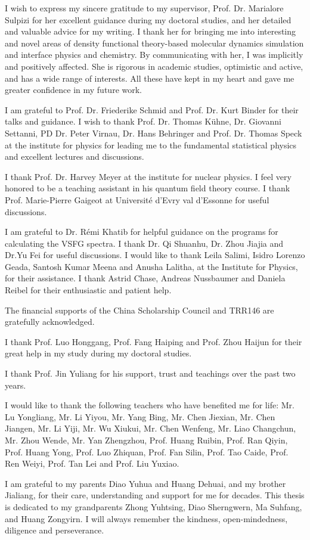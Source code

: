 \documentclass[
11pt, %
ngerman,
english, %
singlespacing, %
headsepline, %
]{MastersDoctoralThesis} %
\begin{document}
\begin{acknowledgements}
\addchaptertocentry{\acknowledgementname} %
I wish to express my sincere gratitude to my supervisor,
Prof. Dr. Marialore Sulpizi for her excellent guidance during my doctoral studies, and her detailed and valuable advice for my writing.
I thank her for bringing me into interesting and novel areas of density functional theory-based molecular dynamics simulation 
and interface physics and chemistry. By communicating with her, I was implicitly and positively affected. 
She is rigorous in academic studies, optimistic and active, and has a wide range of interests. 
All these have kept in my heart and gave me greater confidence in my future work.

%
I am grateful to Prof. Dr. Friederike Schmid  and Prof. Dr. Kurt Binder for their talks and guidance.
I wish to thank Prof. Dr. Thomas Kühne, Dr. Giovanni Settanni, PD Dr. Peter
Virnau, Dr. Hans Behringer and Prof. Dr. Thomas Speck at the institute for
physics for leading me to the fundamental statistical physics and excellent lectures and discussions. 

%
I thank Prof. Dr. Harvey Meyer at the institute for nuclear physics. 
I feel very honored to be a teaching assistant in his quantum field theory course. 
%
I thank Prof. Marie-Pierre Gaigeot at Universit{\'e} d'Evry val d'Essonne for useful discussions.

%
I am grateful to Dr. R\'emi Khatib for helpful guidance on the programs for calculating the VSFG spectra. 
I thank Dr. Qi Shuanhu, Dr. Zhou Jiajia and Dr.Yu Fei for useful discussions. 
I would like to thank Leila Salimi, Isidro Lorenzo Geada, Santosh Kumar Meena and Anusha Lalitha, 
at the Institute for Physics, for their assistance.
%
I thank Astrid Chase, Andreas Nussbaumer and Daniela Reibel for their enthusiastic and patient help.

%
The financial supports of the China Scholarship Council and TRR146 are gratefully acknowledged.

%
I thank Prof. Luo Honggang, Prof. Fang Haiping and Prof. Zhou Haijun for their great help in my study during my doctoral studies. 

%
I thank Prof. Jin Yuliang for his support, trust and teachings over the past two years.

%
I would like to thank the following teachers who have benefited me for life:
Mr. Lu Yongliang, Mr. Li Yiyou, 
Mr. Yang Bing, Mr. Chen Jiexian, Mr. Chen Jiangen, Mr. Li Yiji,
Mr. Wu Xiukui, Mr. Chen Wenfeng, Mr. Liao Changchun, Mr. Zhou Wende,
Mr. Yan Zhengzhou, Prof. Huang Ruibin, Prof. Ran Qiyin, Prof. Huang Yong, Prof. Luo Zhiquan, Prof. Fan Silin, Prof. Tao Caide, Prof. Ren Weiyi, 
Prof. Tan Lei and Prof. Liu Yuxiao.

%
I am grateful to my parents Diao Yuhua and Huang Dehuai, and my brother Jialiang, for their care, 
understanding and support for me for decades. 
This thesis is dedicated to my grandparents Zhong Yuhtsing, Diao Sherngwern, Ma Suhfang, and Huang Zongyirn. 
I will always remember the kindness, open-mindedness, diligence and perseverance.
\end{acknowledgements}
\end{document}

